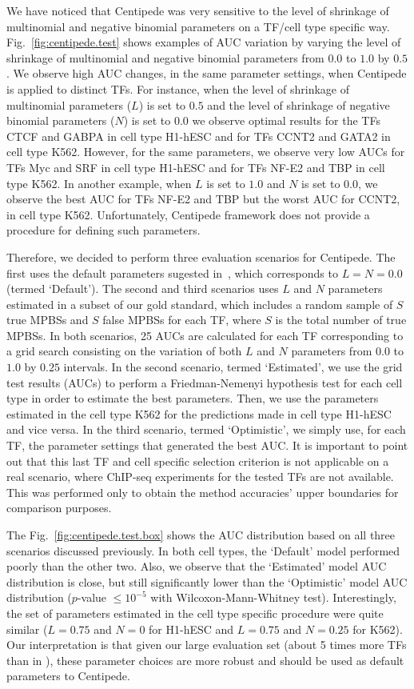 \documentclass{bioinfo}
\begin{document}
We have noticed that Centipede was very sensitive to the level of shrinkage
of multinomial and negative binomial parameters on a TF/cell type specific way.
Fig.~\ref{fig:centipede.test} shows examples of AUC variation by varying the level
of shrinkage of multinomial and negative binomial parameters from $ 0.0 $ to
$ 1.0 $ by $ 0.5 $. We observe high AUC changes, in the same parameter settings,
when Centipede is applied to distinct TFs. For instance, when the level of
shrinkage of multinomial parameters ($L$) is set to $0.5$ and the level
of shrinkage of negative binomial parameters ($N$) is set to $0.0$ we
observe optimal results for the TFs CTCF and GABPA in cell type H1-hESC
and for TFs CCNT2 and GATA2 in cell type K562. However, for the same
parameters, we observe very low AUCs for TFs Myc and SRF in cell type
H1-hESC and for TFs NF-E2 and TBP in cell type K562. In another example,
when $L$ is set to $1.0$ and $N$ is set to $0.0$, we observe the best AUC
for TFs NF-E2 and TBP but the worst AUC for CCNT2, in cell type K562.
Unfortunately, Centipede framework does not provide a procedure for defining
such parameters.

Therefore, we decided to perform three evaluation scenarios for Centipede.
The first uses the default parameters sugested in~\cite{pique2011}, which corresponds to $L = N = 0.0$
(termed `Default'). The second and third scenarios uses $L$ and $N$ parameters
estimated in a subset of our gold standard, which includes a random sample of
$S$ true MPBSs and $S$ false MPBSs for each TF, where $S$ is the total number
of true MPBSs. In both scenarios, 25 AUCs are calculated for each TF corresponding
to a grid search consisting on the variation of both $L$ and $N$ parameters from
$ 0.0 $ to $ 1.0 $ by $ 0.25 $ intervals. In the second scenario, termed `Estimated',
we use the grid test results (AUCs) to perform a Friedman-Nemenyi hypothesis test
for each cell type in order to estimate the best parameters. Then, we use the
parameters estimated in the cell type K562 for the predictions made in cell type
H1-hESC and vice versa. In the third scenario, termed `Optimistic', we simply use,
for each TF, the parameter settings that generated the best AUC. It is important
to point out that this last TF and cell specific selection criterion is not applicable on a
real scenario, where ChIP-seq experiments for the tested TFs are not available. This 
was performed only to obtain the method accuracies' upper boundaries for
comparison purposes.

The Fig.~\ref{fig:centipede.test.box} shows the AUC distribution based on
all three scenarios discussed previously. In both cell types, the `Default'
model performed poorly than the other two. Also, we observe that the `Estimated'
model AUC distribution is close, but still significantly lower than the `Optimistic'
model AUC distribution ($p$-value $\leq 10^{-5}$ with Wilcoxon-Mann-Whitney test). Interestingly,
the set of parameters estimated in the cell type specific procedure were quite similar 
($L=0.75$ and $N=0$ for H1-hESC and  $L=0.75$ and $N=0.25$ for K562). Our interpretation
is that given our large evaluation set (about 5 times more TFs than in \cite{pique2011}), 
these parameter choices are more robust and should be used as default parameters
to Centipede.
\end{document}
